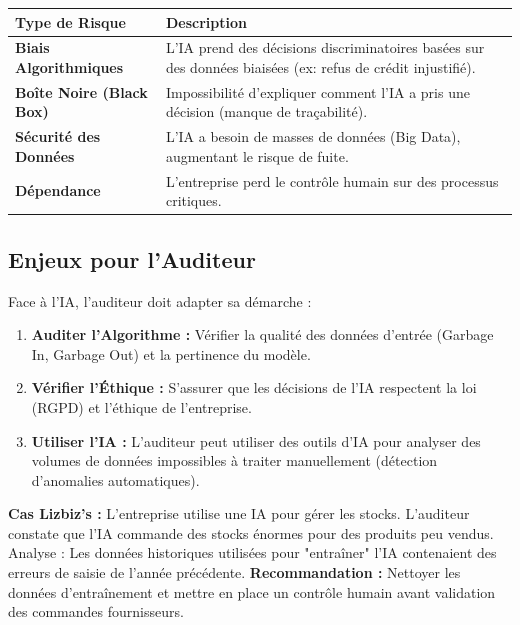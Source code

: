 \begin{table}[h!]
\centering
\begin{tabular}{p{4cm}p{8cm}}
    \toprule
    \textbf{Type de Risque} & \textbf{Description} \\
    \midrule
    \textbf{Biais Algorithmiques} & L'IA prend des décisions discriminatoires basées sur des données biaisées (ex: refus de crédit injustifié). \\
    \textbf{Boîte Noire (Black Box)} & Impossibilité d'expliquer comment l'IA a pris une décision (manque de traçabilité). \\
    \textbf{Sécurité des Données} & L'IA a besoin de masses de données (Big Data), augmentant le risque de fuite. \\
    \textbf{Dépendance} & L'entreprise perd le contrôle humain sur des processus critiques. \\
    \bottomrule
\end{tabular}
\end{table}

\subsection{Enjeux pour l'Auditeur}

Face à l'IA, l'auditeur doit adapter sa démarche :
\begin{enumerate}
    \item \textbf{Auditer l'Algorithme :} Vérifier la qualité des données d'entrée (Garbage In, Garbage Out) et la pertinence du modèle.
    \item \textbf{Vérifier l'Éthique :} S'assurer que les décisions de l'IA respectent la loi (RGPD) et l'éthique de l'entreprise.
    \item \textbf{Utiliser l'IA :} L'auditeur peut utiliser des outils d'IA pour analyser des volumes de données impossibles à traiter manuellement (détection d'anomalies automatiques).
\end{enumerate}

\begin{boxlizbiz}
\textbf{Cas Lizbiz's :}
L'entreprise utilise une IA pour gérer les stocks. L'auditeur constate que l'IA commande des stocks énormes pour des produits peu vendus. Analyse : Les données historiques utilisées pour "entraîner" l'IA contenaient des erreurs de saisie de l'année précédente. \textbf{Recommandation :} Nettoyer les données d'entraînement et mettre en place un contrôle humain avant validation des commandes fournisseurs.
\end{boxlizbiz}

